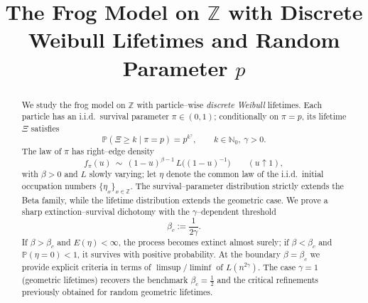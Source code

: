 \documentclass[preprint]{imsart}
\newcommand{\PP}{\mathbb{P}}
\newcommand{\1}{\mathbf{1}}
\theoremstyle{plain}
\theoremstyle{definition}
\begin{document}
\begin{frontmatter}
\title{The Frog Model on $\mathbb{Z}$ with Discrete Weibull Lifetimes and Random Parameter $p$}





\begin{abstract}
We study the frog model on $\mathbb{Z}$ with particle–wise \emph{discrete Weibull} lifetimes. Each particle has an i.i.d.\ survival parameter $\pi\in(0,1)$; conditionally on $\pi=p$, its lifetime $\Xi$ satisfies
\[
\PP(\Xi\ge k\mid \pi=p)=p^{k^{\gamma}},\qquad k\in\mathbb{N}_0,\ \gamma>0.
\]
The law of $\pi$ has right–edge density
\[
f_\pi(u)\ \sim\ (1-u)^{\beta-1}\,L\!\big((1-u)^{-1}\big)\qquad (u\uparrow 1),
\]
with $\beta>0$ and $L$ slowly varying; let $\eta$ denote the common law of the i.i.d.\ initial occupation numbers $\{\eta_x\}_{x\in\mathbb{Z}}$. The survival–parameter distribution strictly extends the Beta family, while the lifetime distribution extends the geometric case.  
We prove a sharp extinction–survival dichotomy with the $\gamma$–dependent threshold
\[
\beta_c:=\frac{1}{2\gamma}.
\]
If $\beta>\beta_c$ and $E(\eta)<\infty$, the process becomes extinct almost surely; if $\beta<\beta_c$ and $\PP(\eta=0)<1$, it survives with positive probability. At the boundary $\beta=\beta_c$ we provide explicit criteria in terms of $\limsup/\liminf$ of $L(n^{2\gamma})$. The case $\gamma=1$ (geometric lifetimes) recovers the benchmark $\beta_c=\tfrac12$ and the critical refinements previously obtained for random geometric lifetimes.

\end{abstract}



\begin{keyword}[class=MSC2020]
\end{keyword}

\begin{keyword}
\end{keyword}

\end{frontmatter}
\end{document}
